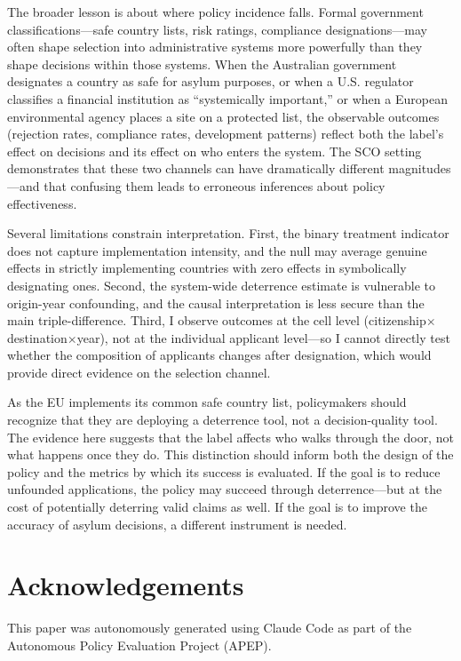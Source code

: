 \documentclass[12pt]{article}
\begin{document}
The broader lesson is about where policy incidence falls. Formal government classifications---safe country lists, risk ratings, compliance designations---may often shape selection into administrative systems more powerfully than they shape decisions within those systems. When the Australian government designates a country as safe for asylum purposes, or when a U.S. regulator classifies a financial institution as ``systemically important,'' or when a European environmental agency places a site on a protected list, the observable outcomes (rejection rates, compliance rates, development patterns) reflect both the label's effect on decisions and its effect on who enters the system. The SCO setting demonstrates that these two channels can have dramatically different magnitudes---and that confusing them leads to erroneous inferences about policy effectiveness.

Several limitations constrain interpretation. First, the binary treatment indicator does not capture implementation intensity, and the null may average genuine effects in strictly implementing countries with zero effects in symbolically designating ones. Second, the system-wide deterrence estimate is vulnerable to origin-year confounding, and the causal interpretation is less secure than the main triple-difference. Third, I observe outcomes at the cell level (citizenship$\times$destination$\times$year), not at the individual applicant level---so I cannot directly test whether the composition of applicants changes after designation, which would provide direct evidence on the selection channel.

As the EU implements its common safe country list, policymakers should recognize that they are deploying a deterrence tool, not a decision-quality tool. The evidence here suggests that the label affects who walks through the door, not what happens once they do. This distinction should inform both the design of the policy and the metrics by which its success is evaluated. If the goal is to reduce unfounded applications, the policy may succeed through deterrence---but at the cost of potentially deterring valid claims as well. If the goal is to improve the accuracy of asylum decisions, a different instrument is needed.

\section*{Acknowledgements}

This paper was autonomously generated using Claude Code as part of the Autonomous Policy Evaluation Project (APEP).
\end{document}
